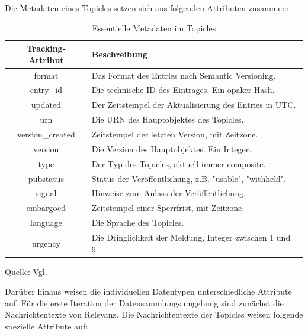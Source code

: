 Die Metadaten eines Topicles setzen sich aus folgenden Attributen zusammen:
\begin{table}
    \centering
    \caption{Essentielle Metadaten im Topicles}
    \label{tab:Essentielle Metadaten im Topicles}
    \begin{tabular}{|c|p{11cm}|} \hline         
        \textbf{Tracking-Attribut} & \textbf{Beschreibung} \\ \hline 
            format                  & Das Format des Entries nach Semantic Versioning.           \\ \hline
            entry\_id               & Die technische ID des Eintrages. Ein opaker Hash.          \\ \hline
            updated                 & Der Zeitstempel der Aktualisierung des Entries in UTC.     \\ \hline
            urn                     & Die URN des Hauptobjektes des Topicles.                    \\ \hline
            version\_created        & Zeitstempel der letzten Version, mit Zeitzone.             \\ \hline
            version                 & Die Version des Hauptobjektes. Ein Integer.                \\ \hline
            type                    & Der Typ des Topicles, aktuell immer composite.             \\ \hline
            pubstatus               & Status der Veröffentlichung, z.B. "usable", "withheld".    \\ \hline
            signal                  & Hinweise zum Anlass der Veröffentlichung.                  \\ \hline
            embargoed               & Zeitstempel einer Sperrfrist, mit Zeitzone.                \\ \hline
            language                & Die Sprache des Topicles.                                  \\ \hline
            urgency                 & Die Dringlichkeit der Meldung, Integer zwischen 1 und 9.   \\ \hline
    \end{tabular}

    Quelle: Vgl. 
\end{table}

Darüber hinaus weisen die individuellen Datentypen unterschiedliche Attribute auf. Für die erste Iteration der Datensammlungsumgebung sind zunächst die Nachrichtentexte von Relevanz. 
Die Nachrichtentexte der Topicles weisen folgende spezielle Attribute auf:

